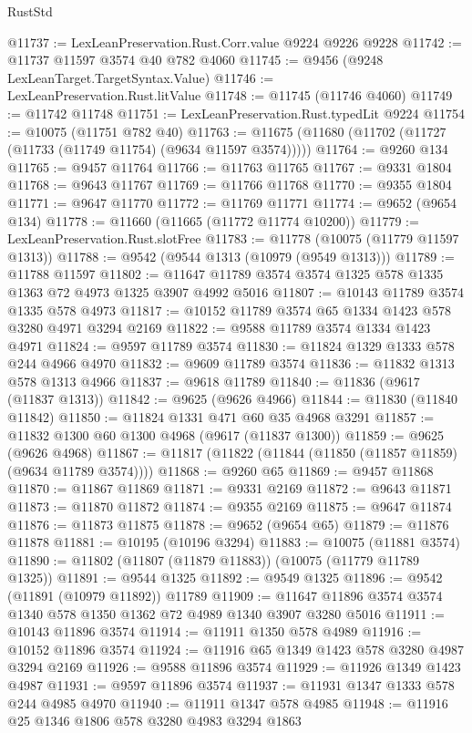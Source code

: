 \begin{lexlean}{RustStd}
\begin{coremodule}
{\begin{coremodule}
{{{{{{{{{{{{{{{{{{{{{{{{{{{{{{{{{@11737 := LexLeanPreservation.Rust.Corr.value @9224 @9226 @9228
@11742 := @11737 @11597 @3574 @40 @782 @4060
@11745 := @9456 (@9248 LexLeanTarget.TargetSyntax.Value)
@11746 := LexLeanPreservation.Rust.litValue
@11748 := @11745 (@11746 @4060)
@11749 := @11742 @11748
@11751 := LexLeanPreservation.Rust.typedLit @9224
@11754 := @10075 (@11751 @782 @40)
@11763 := @11675 (@11680 (@11702 (@11727 (@11733 (@11749 @11754) (@9634 @11597 @3574)))))
@11764 := @9260 @134
@11765 := @9457 @11764
@11766 := @11763 @11765
@11767 := @9331 @1804
@11768 := @9643 @11767
@11769 := @11766 @11768
@11770 := @9355 @1804
@11771 := @9647 @11770
@11772 := @11769 @11771
@11774 := @9652 (@9654 @134)
@11778 := @11660 (@11665 (@11772 @11774 @10200))
@11779 := LexLeanPreservation.Rust.slotFree
@11783 := @11778 (@10075 (@11779 @11597 @1313))
@11788 := @9542 (@9544 @1313 (@10979 (@9549 @1313)))
@11789 := @11788 @11597
@11802 := @11647 @11789 @3574 @3574 @1325 @578 @1335 @1363 @72 @4973 @1325 @3907 @4992 @5016
@11807 := @10143 @11789 @3574 @1335 @578 @4973
@11817 := @10152 @11789 @3574 @65 @1334 @1423 @578 @3280 @4971 @3294 @2169
@11822 := @9588 @11789 @3574 @1334 @1423 @4971
@11824 := @9597 @11789 @3574
@11830 := @11824 @1329 @1333 @578 @244 @4966 @4970
@11832 := @9609 @11789 @3574
@11836 := @11832 @1313 @578 @1313 @4966
@11837 := @9618 @11789
@11840 := @11836 (@9617 (@11837 @1313))
@11842 := @9625 (@9626 @4966)
@11844 := @11830 (@11840 @11842)
@11850 := @11824 @1331 @471 @60 @35 @4968 @3291
@11857 := @11832 @1300 @60 @1300 @4968 (@9617 (@11837 @1300))
@11859 := @9625 (@9626 @4968)
@11867 := @11817 (@11822 (@11844 (@11850 (@11857 @11859) (@9634 @11789 @3574))))
@11868 := @9260 @65
@11869 := @9457 @11868
@11870 := @11867 @11869
@11871 := @9331 @2169
@11872 := @9643 @11871
@11873 := @11870 @11872
@11874 := @9355 @2169
@11875 := @9647 @11874
@11876 := @11873 @11875
@11878 := @9652 (@9654 @65)
@11879 := @11876 @11878
@11881 := @10195 (@10196 @3294)
@11883 := @10075 (@11881 @3574)
@11890 := @11802 (@11807 (@11879 @11883)) (@10075 (@11779 @11789 @1325))
@11891 := @9544 @1325
@11892 := @9549 @1325
@11896 := @9542 (@11891 (@10979 @11892)) @11789
@11909 := @11647 @11896 @3574 @3574 @1340 @578 @1350 @1362 @72 @4989 @1340 @3907 @3280 @5016
@11911 := @10143 @11896 @3574
@11914 := @11911 @1350 @578 @4989
@11916 := @10152 @11896 @3574
@11924 := @11916 @65 @1349 @1423 @578 @3280 @4987 @3294 @2169
@11926 := @9588 @11896 @3574
@11929 := @11926 @1349 @1423 @4987
@11931 := @9597 @11896 @3574
@11937 := @11931 @1347 @1333 @578 @244 @4985 @4970
@11940 := @11911 @1347 @578 @4985
@11948 := @11916 @25 @1346 @1806 @578 @3280 @4983 @3294 @1863
}}}}}}}}}}}}}}}}}}}}}}}}}}}}}}}}}
\end{coremodule}}
\end{coremodule}
\end{lexlean}
